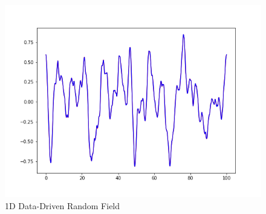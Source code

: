 \documentclass{article}
\begin{document}
\begin{figure}[H]
    \centering
    \includegraphics[width=0.5\linewidth]{pics/1D_DataDrivenRF_4096_100.0_2_1.png}
    \caption{1D Data-Driven Random Field}
    \label{DataDrivenRF}
\end{figure}
\end{document}
